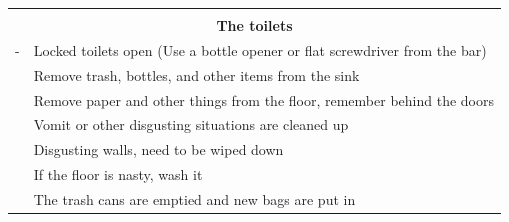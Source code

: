 \documentclass[a4paper,10pt,oneside,article]{memoir}
\begin{document}
\vspace{0.5cm}
\noindent
\begin{tabular}{|l|l|}
    \hline
    \multicolumn{2}{|c|}{} \\
    \multicolumn{2}{|c|}{\Large \textbf{The toilets}} \\
    \hline
    \begin{minipage}[t]{0.15\textwidth}
        {\color{white}-}
    \end{minipage} & 
    \begin{minipage}[t]{0.80\textwidth}
        Locked toilets open (Use a bottle opener or flat screwdriver from the bar)
    \end{minipage} \\
    \hline
    \begin{minipage}[t]{0.15\textwidth}
    \end{minipage} & 
    \begin{minipage}[t]{0.80\textwidth}
        Remove trash, bottles, and other items from the sink
    \end{minipage} \\
    \hline
    \begin{minipage}[t]{0.15\textwidth}
    \end{minipage} & 
    \begin{minipage}[t]{0.80\textwidth}
        Remove paper and other things from the floor, remember behind the doors
    \end{minipage} \\
    \hline
    \begin{minipage}[t]{0.15\textwidth}
    \end{minipage} & 
    \begin{minipage}[t]{0.80\textwidth}
        Vomit or other disgusting situations are cleaned up
    \end{minipage} \\
    \hline
    \begin{minipage}[t]{0.15\textwidth}
    \end{minipage} & 
    \begin{minipage}[t]{0.80\textwidth}
        Disgusting walls, need to be wiped down
    \end{minipage} \\
    \hline
    \begin{minipage}[t]{0.15\textwidth}
    \end{minipage} & 
    \begin{minipage}[t]{0.80\textwidth}
        If the floor is nasty, wash it
    \end{minipage} \\
    \hline
    \begin{minipage}[t]{0.15\textwidth}
    \end{minipage} & 
    \begin{minipage}[t]{0.80\textwidth}
        The trash cans are emptied and new bags are put in
    \end{minipage} \\
    \hline
\end{tabular}
\end{document}
